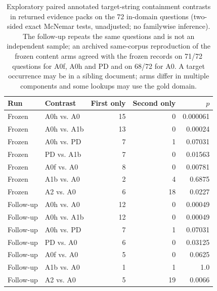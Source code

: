 \documentclass[11pt]{article}
\begin{document}
\begin{table}
\centering\small
\caption{Exploratory paired annotated target-string containment contrasts in
returned evidence packs on the 72 in-domain questions (two-sided exact
McNemar tests, unadjusted; no familywise inference). The follow-up repeats the
same questions and is not an independent sample; an archived same-corpus
reproduction of the frozen content arms agreed with the frozen records on
71/72 questions for A0f, A0h and PD and on 68/72 for A0. A target occurrence
may be in a sibling document; arms differ in multiple components and some
lookups may use the gold domain.}

\begin{tabular}{llrrr}
\toprule
Run & Contrast & First only & Second only & $p$ \\
\midrule
Frozen & A0h vs. A0 & 15 & 0 & 0.000061 \\
Frozen & A0h vs. A1b & 13 & 0 & 0.00024 \\
Frozen & A0h vs. PD & 7 & 1 & 0.07031 \\
Frozen & PD vs. A1b & 7 & 0 & 0.01563 \\
Frozen & A0f vs. A0 & 8 & 0 & 0.00781 \\
Frozen & A1b vs. A0 & 2 & 4 & 0.6875 \\
Frozen & A2 vs. A0 & 6 & 18 & 0.0227 \\
Follow-up & A0h vs. A0 & 12 & 0 & 0.00049 \\
Follow-up & A0h vs. A1b & 12 & 0 & 0.00049 \\
Follow-up & A0h vs. PD & 7 & 1 & 0.07031 \\
Follow-up & PD vs. A0 & 6 & 0 & 0.03125 \\
Follow-up & A0f vs. A0 & 5 & 0 & 0.0625 \\
Follow-up & A1b vs. A0 & 1 & 1 & 1.0 \\
Follow-up & A2 vs. A0 & 5 & 19 & 0.0066 \\
\bottomrule
\end{tabular}
\end{table}
\end{document}
